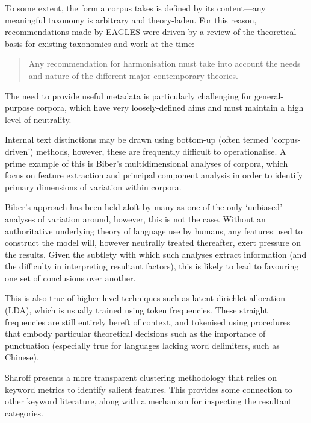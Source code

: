 To some extent, the form a corpus takes is defined by its content---any meaningful taxonomy is arbitrary and theory-laden.  For this reason, recommendations made by EAGLES were driven by a review of the theoretical basis for existing taxonomies and work at the time\cite{EagTcwgCtypeaglespreliminary}:

\begin{quote}
Any recommendation for harmonisation must take into account the needs and nature of the different major contemporary theories.
\end{quote}

The need to provide useful metadata is particularly challenging for general-purpose corpora, which have very loosely-defined aims and must maintain a high level of neutrality.




Internal text distinctions may be drawn using bottom-up (often termed `corpus-driven') methods, however, these are frequently difficult to operationalise.  A prime example of this is Biber's multidimensional analyses of corpora\cite{biber1992complexity}, which focus on feature extraction and principal component analysis in order to identify primary dimensions of variation within corpora.

Biber's approach has been held aloft by many as one of the only `unbiased' analyses of variation around, however, this is not the case.  Without an authoritative underlying theory of language use by humans, any features used to construct the model will, however neutrally treated thereafter, exert pressure on the results.  Given the subtlety with which such analyses extract information (and the difficulty in interpreting resultant factors), this is likely to lead to favouring one set of conclusions over another.

This is also true of higher-level techniques such as latent dirichlet allocation (LDA), which is usually trained using token frequencies\cite{Blei2012PTM1338062133826}.  These straight frequencies are still entirely bereft of context, and tokenised using procedures that embody particular theoretical decisions such as the importance of punctuation\cite{pentheroudakis2006tokenizer} (especially true for languages lacking word delimiters, such as Chinese\cite{Wu1994ICT974358974399}).  

Sharoff\cite{sharoff2007classifying} presents a more transparent clustering methodology that relies on keyword metrics to identify salient features.  This provides some connection to other keyword literature, along with a mechanism for inspecting the resultant categories.

